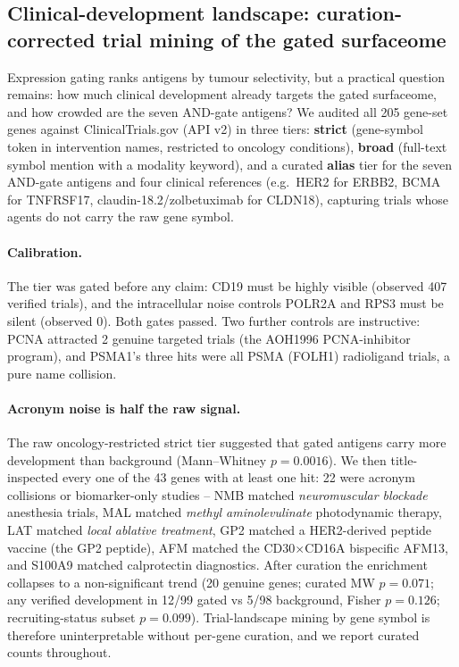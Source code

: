 \subsection{Clinical-development landscape: curation-corrected trial mining of the gated surfaceome}
\label{sec:clintrials}
Expression gating ranks antigens by tumour selectivity, but a practical question
remains: how much clinical development already targets the gated surfaceome, and
how crowded are the seven AND-gate antigens? We audited all 205 gene-set
genes against ClinicalTrials.gov (API v2) in three tiers: \textbf{strict}
(gene-symbol token in intervention names, restricted to oncology conditions),
\textbf{broad} (full-text symbol mention with a modality keyword), and a curated
\textbf{alias} tier for the seven AND-gate antigens and four clinical references
(e.g.\ HER2 for ERBB2, BCMA for TNFRSF17, claudin-18.2/zolbetuximab for CLDN18),
capturing trials whose agents do not carry the raw gene symbol.

\paragraph{Calibration.} The tier was gated before any claim: CD19 must be
highly visible (observed 407 verified trials), and the intracellular
noise controls POLR2A and RPS3 must be silent (observed 0). Both gates
passed. Two further controls are instructive: PCNA attracted 2 genuine
targeted trials (the AOH1996 PCNA-inhibitor program), and PSMA1's three hits
were all PSMA (FOLH1) radioligand trials, a pure name collision.

\paragraph{Acronym noise is half the raw signal.} The raw oncology-restricted
strict tier suggested that gated antigens carry more development than background
(Mann--Whitney $p = 0.0016$). We then title-inspected every one of the
43 genes with at least one hit: 22 were acronym collisions or
biomarker-only studies -- NMB matched \emph{neuromuscular blockade} anesthesia
trials, MAL matched \emph{methyl aminolevulinate} photodynamic therapy, LAT
matched \emph{local ablative treatment}, GP2 matched a HER2-derived peptide
vaccine (the GP2 peptide), AFM matched the CD30$\times$CD16A bispecific AFM13,
and S100A9 matched calprotectin diagnostics. After curation the enrichment
collapses to a non-significant trend (20 genuine genes; curated MW
$p = 0.071$; any verified development in 12/99 gated vs 5/98 background,
Fisher $p = 0.126$; recruiting-status subset $p = 0.099$). Trial-landscape
mining by gene symbol is therefore uninterpretable without per-gene curation,
and we report curated counts throughout.

